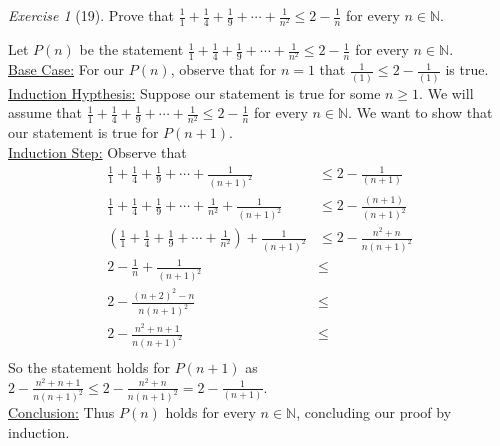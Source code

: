 \documentclass[12pt]{amsart}
\makeatletter
\theoremstyle{remark}
\newtheorem*{exercise}{Exercise}%
\def\NN{\ensuremath{\mathbb N}}
\renewenvironment{proof}[1][\proofname]{\par\doublespacing
  \pushQED{\qed}%
  \normalfont \topsep6\p@\@plus6\p@\relax
  \list{}{%
    \settowidth{\leftmargin}{\itshape\proofname:\hskip\labelsep}%
    \setlength{\labelwidth}{0pt}%
    \setlength{\itemindent}{-\leftmargin}%
  }%
  \item[\hskip\labelsep\itshape#1\@addpunct{:}]\ignorespaces
}{%
  \popQED\endlist\@endpefalse
  \singlespacing
}
\theoremstyle{mycomment}
\makeatother
\begin{document}
\begin{exercise}[19] Prove that $\displaystyle \frac{1}{1}+\frac{1}{4}+\frac{1}{9}+\cdots+\frac{1}{n^{2}}\le 2-\frac{1}{n}$ for every $n\in\NN$.
\begin{proof}
  Let $P(n)$ be the statement $\displaystyle \frac{1}{1}+\frac{1}{4}+\frac{1}{9}+\cdots+\frac{1}{n^{2}}\le 2-\frac{1}{n}$ for every $n\in\NN$.\\
  \underline{Base Case:} For our $P(n)$, observe that for $n=1$ that $\frac{1}{(1)} \leq 2 - \frac{1}{(1)}$ is true. \\
  \underline{Induction Hypthesis:} Suppose our statement is true for some $n \geq 1$. We will assume that  $\displaystyle \frac{1}{1}+\frac{1}{4}+\frac{1}{9}+\cdots+\frac{1}{n^{2}}\le 2-\frac{1}{n}$ for every $n\in\NN$. We want to show that our statement is true for $P(n+1)$. \\
  \underline{Induction Step:} Observe that
  \begin{align*}
    \displaystyle \frac{1}{1}+\frac{1}{4}+\frac{1}{9}+\cdots+\frac{1}{(n+1)^{2}} &\leq  2 - \frac{1}{(n+1)}\\
    \displaystyle \frac{1}{1}+\frac{1}{4}+\frac{1}{9}+\cdots+\frac{1}{n^{2}} + \frac{1}{(n+1)^2} &\leq 2 - \frac{(n+1)}{(n+1)^2}\\
    (\displaystyle \frac{1}{1}+\frac{1}{4}+\frac{1}{9}+\cdots+\frac{1}{n^{2}}) + \frac{1}{(n+1)^2} &\leq 2 - \frac{n^2 + n}{n(n+1)^2}\\
    2 - \frac{1}{n} + \frac{1}{(n+1)^2} &\leq \\
    2 - \frac{(n+2)^2 - n}{n(n+1)^2} &\leq \\
    2 - \frac{n^2 + n + 1}{n(n+1)^2} &\leq \\
  \end{align*}
  So the statement holds for $P(n+1)$ as $ 2 - \frac{n^2 + n + 1}{n(n+1)^2} \leq 2 - \frac{n^2 + n}{n(n+1)^2} = 2 - \frac{1}{(n+1)}$. \\
  \underline{Conclusion:} Thus $P(n)$ holds for every $n \in \NN$, concluding our proof by induction.
\end{proof}
\end{exercise}
\end{document}

